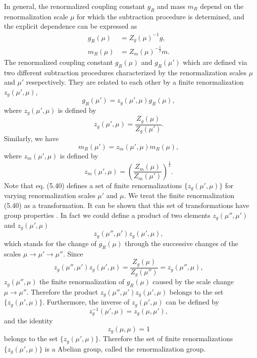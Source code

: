 In general, the renormalized coupling constant $g_R$ and mass $m_R$ depend on the renormalization scale $\mu$ for which the subtraction procedure is determined, and the explicit dependence can be expressed as
\begin{align}
g_R(\mu)&=Z_g(\mu)^{-1}g,\nonumber\\
m_R(\mu)&=Z_m(\mu)^{-\frac{1}{2}}m.
\end{align}
The renormalized coupling constant $g_R(\mu)$ and $g_R(\mu')$ which are defined via two different subtraction procedures characterized by the renormalization scales $\mu$ and $\mu'$ resepectively. They are related to each other by a finite renormalization $z_g(\mu',\mu)$, 
\begin{equation}
g_R(\mu')=z_g(\mu',\mu)g_R(\mu),
\end{equation}
where $z_g(\mu',\mu)$ is defined by
\begin{equation}
z_g(\mu',\mu)=\frac{Z_g(\mu)}{Z_g(\mu')}.
\end{equation}
Similarly, we have 
\begin{equation}
m_R(\mu')=z_m(\mu',\mu)m_R(\mu),
\end{equation}
where $z_m(\mu',\mu)$ is defined by
\begin{equation}
z_m(\mu',\mu)=\left(\frac{Z_m(\mu)}{Z_m(\mu')}\right)^\frac{1}{2}.
\end{equation}
Note that eq. (5.40) defines a set of finite renormalizations $\{z_g(\mu',\mu)\}$ for varying renormalization scales $\mu'$ and $\mu$. We treat the finite renormalization (5.40) as a transformation. It can be shown that this set of transformations have group properties \cite{Wil71}. In fact we could define a product of two elements $z_g(\mu'',\mu')$ and $z_g(\mu',\mu)$
\begin{equation}
z_g(\mu'',\mu')z_g(\mu',\mu),
\end{equation}
which stands for the change of $g_R(\mu)$ through the successive changes of the scales $\mu\to\mu'\to\mu''$. Since
\begin{equation}
z_g(\mu'',\mu')z_g(\mu',\mu)=\frac{Z_g(\mu)}{Z_g{(\mu'')}}=z_g(\mu'',\mu),
\end{equation}
$z_g(\mu'',\mu)$ the finite renormalization of $g_R(\mu)$ caused by the scale change $\mu\to\mu''$. Therefore the product $z_g(\mu'',\mu')z_g(\mu',\mu)$ belongs to the set $\{z_g(\mu',\mu)\}$. Furthermore, the inverse of $z_g(\mu',\mu)$ can be defined by 
\begin{equation}
z^{-1}_g(\mu',\mu)=z_g(\mu,\mu'),
\end{equation}
and the identity 
\begin{equation}
z_g(\mu,\mu)=1
\end{equation}
belongs to the set $\{z_g(\mu',\mu)\}$. Therefore the set of finite renormalizations $\{z_g(\mu',\mu)\}$ is a Abelian group, called the renormalization group.


